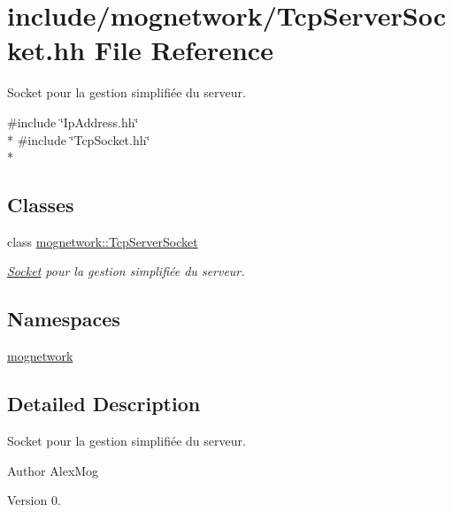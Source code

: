 \hypertarget{_tcp_server_socket_8hh}{\section{include/mognetwork/\-Tcp\-Server\-Socket.hh File Reference}
\label{_tcp_server_socket_8hh}
}


Socket pour la gestion simplifiée du serveur.  


{\ttfamily \#include \char`\"{}Ip\-Address.\-hh\char`\"{}}\\*
{\ttfamily \#include \char`\"{}Tcp\-Socket.\-hh\char`\"{}}\\*
\subsection*{Classes}
\begin{DoxyCompactItemize}
\item 
class \hyperlink{classmognetwork_1_1_tcp_server_socket}{mognetwork\-::\-Tcp\-Server\-Socket}
\begin{DoxyCompactList}\small\item\em \hyperlink{classmognetwork_1_1_socket}{Socket} pour la gestion simplifiée du serveur. \end{DoxyCompactList}\end{DoxyCompactItemize}
\subsection*{Namespaces}
\begin{DoxyCompactItemize}
\item 
\hyperlink{namespacemognetwork}{mognetwork}
\end{DoxyCompactItemize}


\subsection{Detailed Description}
Socket pour la gestion simplifiée du serveur. \begin{DoxyAuthor}{Author}
Alex\-Mog 
\end{DoxyAuthor}
\begin{DoxyVersion}{Version}
0. 
\end{DoxyVersion}
